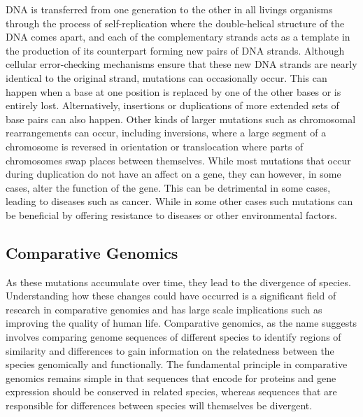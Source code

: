 DNA is transferred from one generation to the other in all livings organisms through the process of self-replication where the double-helical structure of the DNA comes apart, and each of the complementary strands acts as a template in the production of its counterpart forming new pairs of DNA strands\cite{pray2008semi}. Although cellular error-checking mechanisms ensure that these new DNA strands are nearly identical to the original strand, mutations can occasionally occur. This can happen when a base at one position is replaced by one of the other bases or is entirely lost. Alternatively, insertions or duplications of more extended sets of base pairs can also happen. Other kinds of larger mutations such as chromosomal rearrangements can occur, including inversions, where a large segment of a chromosome is reversed in orientation or translocation where parts of chromosomes swap places between themselves\cite{hartwell2008genetics}. While most mutations that occur during duplication do not have an affect on a gene, they can however, in some cases, alter the function of the gene. This can be detrimental in some cases, leading to diseases such as cancer. While in some other cases such mutations can be beneficial by offering resistance to diseases or other environmental factors. 

\subsection{Comparative Genomics}
As these mutations accumulate over time, they lead to the divergence of species. Understanding how these changes could have occurred is a significant field of research in comparative genomics and has large scale implications such as improving the quality of human life\cite{collins2003vision}. Comparative genomics, as the name suggests involves comparing genome sequences of different species to identify regions of similarity and differences to gain information on the relatedness between the species genomically and functionally. The fundamental principle in comparative genomics remains simple in that sequences that encode for proteins and gene expression should be conserved in related species, whereas sequences that are responsible for differences between species will themselves be divergent\cite{hardison2003comparative}.

